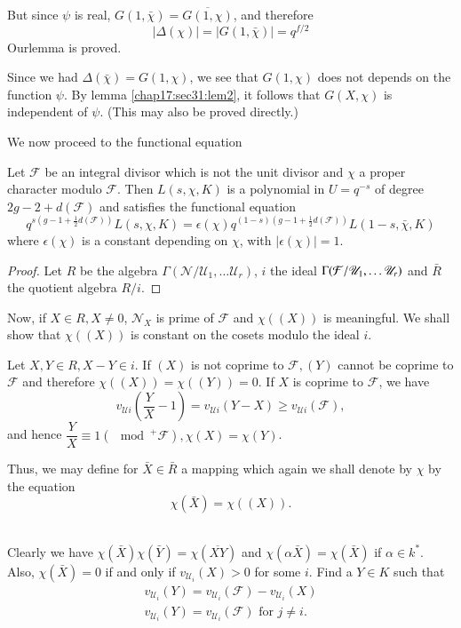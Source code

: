 But since $\psi$ is real, \quad $G(1,
\bar{\chi})=\overline{G(1,\chi)}$, and therefore 
$$
|\Delta(\chi)|=|G(1, \bar{\chi})|=q^{f/2}
$$
Our\pageoriginale lemma is proved.

Since we had $\Delta (\bar{\chi})=G(1, \chi)$, we see that $G(1,
\chi)$ does not depends on the function $\psi$. By lemma \ref{chap17:sec31:lem2}, it
follows that $G(X, \chi)$ is independent of $\psi$. (This may also be
proved directly.) 

We now proceed to the functional equation

\begin{theorem*}
  Let $\mathcal{F}$ be an integral divisor which is not the unit
  divisor and $\chi$ a proper character modulo $\mathcal{F}$. Then
  $L(s,\chi ,K)$ is a polynomial in $U=q^{-s}$ of degree
  $2g-2+d(\mathcal{F})$ and satisfies the functional equation 
  $$
  q^{s(g-1 +\frac{1}{2}d(\mathcal{F}))}L(s, \chi,K)=\epsilon
  (\chi)q^{(1-s)(g-1 +\frac{1}{2}d(\mathcal{F}))} L(1-s,\bar{\chi},K) 
  $$
  where $\epsilon (\chi)$ is a constant depending on $\chi$, with
  $|\epsilon (\chi)|=1$. 
\end{theorem*}

\begin{proof}
  Let $R$ be the algebra $\Gamma(\mathscr{N}/\mathscr{U}_1, \ldots
  \mathscr{U}_r)$, $i$ the ideal
  $\Gamma(\mathcal{F}/\mathscr{U}_1,\break \ldots \mathscr{U}_r)$ and
  $\bar{R}$ the quotient algebra $R/i$. 
\end{proof}

Now, if $X \in R, X \neq 0$, $\mathscr{N}_X$ is prime of
$\mathcal{F}$ and $\chi((X))$ is meaningful. We shall show that
$\chi((X))$ is constant on the cosets modulo the ideal $i$. 

Let $X,Y \in R,X-Y \in i$. If $(X)$ is not coprime to
$\mathcal{F},(Y)$ cannot be coprime to $\mathcal{F}$ and therefore
$\chi((X))=\chi ((Y))=0$. If $X$ is coprime to $\mathcal{F}$, we have 
$$
v_{\mathscr{U}i}\left(\frac{Y}{X}-1\right)=v_{\mathscr{U}i}(Y-X)\geq
v_{\mathscr{U}i} (\mathcal{F}), 
$$
and hence $\dfrac{Y}{X}\equiv 1(\mod^+ \mathcal{F}),\chi(X)=\chi(Y)$.

Thus, we may define for $\bar{X}\in\bar{R}$ a mapping which again we
shall denote by $\chi$ by the equation 
$$
\chi (\bar{X})=\chi ((X)).
$$\pageoriginale\

Clearly we have $\chi (\bar{X})\chi(\bar{Y})=\chi (\overline{XY})$ and
$\chi(\alpha \bar{X})=\chi (\bar{X})$ if $\alpha \in k^*$. Also, $\chi
(\bar{X})=0$ if and only if $v_{\mathscr{U}_i}(X)>0$ for some
$i$. Find a $Y \in K$ such that 
\begin{gather*}
  v_{\mathscr{U}_i}(Y)=v_{\mathscr{U}_i}(\mathcal{F})-v_{\mathscr{U}_i}(X)\\
  v_{\mathscr{U}_i}(Y)=v_{\mathscr{U}_i}(\mathcal{F}) \text{ for } j \neq i.
\end{gather*}

